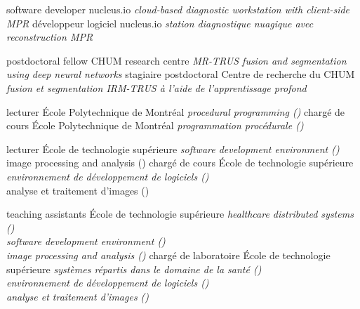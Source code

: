 \documentclass[print]{friggeri-cv}
\begin{document}
\begin{entrylist}
  \engfr
  { {software developer} {nucleus.io} {\emph{cloud-based diagnostic workstation with client-side MPR}}}
  { {développeur logiciel} {nucleus.io} {\emph{station diagnostique nuagique avec reconstruction MPR}}}

  \engfr
  { {postdoctoral fellow} {CHUM research centre} {\emph{MR-TRUS fusion and segmentation using deep neural networks}}}
  { {stagiaire postdoctoral} {Centre de recherche du CHUM} {\emph{fusion et segmentation IRM-TRUS à l'aide de l'apprentissage profond}}}

  \engfr
  { {lecturer} {École Polytechnique de Montréal} {\emph{procedural programming (\infmat)}}}
  { {chargé de cours} {École Polytechnique de Montréal} {\emph{programmation procédurale (\infmat)}}}

  \engfr
  { {lecturer} {École de technologie supérieure} {\emph{software development environment (\eleenv)}\\image processing and analysis (\eletr) }}
  { {chargé de cours} {École de technologie supérieure} {\emph{environnement de développement de logiciels (\eleenv)}\\analyse et traitement d'images (\eletr)}}

  \engfr
  { {teaching assistants} {École de technologie supérieure} {\emph{healthcare distributed systems (\gtssys)\\software development environment (\eleenv)\\image processing and analysis (\eletr)}}}
  { {chargé de laboratoire} {École de technologie supérieure} {\emph{systèmes répartis dans le domaine de la santé (\gtssys)\\environnement de développement de logiciels (\eleenv)\\analyse et traitement d'images (\eletr)}}}


\end{entrylist}
\end{document}
